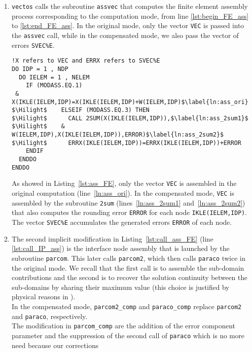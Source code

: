 \begin{enumerate}
\item  \texttt{vectos} calls the subroutine \texttt{assvec} that computes
the finite element assembly process corresponding to the computation mode,
from line \ref{lst:begin_FE_ass} to \ref{lst:end_FE_ass}.
In the original mode, only the vector \texttt{VEC} is passed into the \texttt{assvec} call,
while in the compensated mode, we also pass the
vector of errors \texttt{SVEC\%E}.
%
\begin{lstlisting}[language=TelFortran, caption={The FE assembly in \texttt{assvec}},label={lst:ass_FE},escapechar=\$]
!X refers to VEC and ERRX refers to SVEC%E 
DO IDP = 1 , NDP
  DO IELEM = 1 , NELEM
    IF (MODASS.EQ.1) 
 &   X(IKLE(IELEM,IDP)=X(IKLE(IELEM,IDP)+W(IELEM,IDP)$\label{ln:ass_ori}$
$\Hilight$    ELSEIF (MODASS.EQ.3) THEN 
$\Hilight$      CALL 2SUM(X(IKLE(IELEM,IDP)),$\label{ln:ass_2sum1}$
$\Hilight$    &   W(IELEM,IDP),X(IKLE(IELEM,IDP)),ERROR)$\label{ln:ass_2sum2}$
$\Hilight$      ERRX(IKLE(IELEM,IDP))=ERRX(IKLE(IELEM,IDP))+ERROR              
    ENDIF
  ENDDO
ENDDO
\end{lstlisting}
%
As showed in Listing~\ref{lst:ass_FE}, 
only the vector \texttt{VEC} is assembled in the original computation (line~\ref{ln:ass_ori}).
In the compensated mode, \texttt{VEC} is assembled by the 
subroutine \texttt{2sum} (lines~\ref{ln:ass_2sum1} and~\ref{ln:ass_2sum2})
that also computes the rounding error \texttt{ERROR} 
for each node \texttt{IKLE(IELEM,IDP)}. The vector \texttt{SVEC\%E} accumulates
the generated errors \texttt{ERROR} of each node.
%
\item \label{item:2IPmodif} The second implicit modification in Listing~\ref{lst:call_ass_FE} (line \ref{lst:call_IP_ass}) 
is the interface node assembly that is launched by the subroutine \texttt{parcom}.
This later calls \texttt{parcom2}, which then calls \texttt{paraco} twice
in the original mode. We recall that the first call is to assemble 
the sub-domain contributions and the second is to recover the solution continuity
between the sub-domains by sharing their maximum value 
(this choice is justified by physical reasons in \cite{Hervouet2007}). \\
%
In the compensated mode,
\texttt{parcom2\_comp} and \texttt{paraco\_comp} replace 
\texttt{parcom2} and \texttt{paraco}, respectively.\\
%
The modification in \texttt{parcom\_comp} are the addition of the 
error component parameter and  the suppression of the second call of  
\texttt{paraco} which is no more need because our corrections

\end{enumerate}
